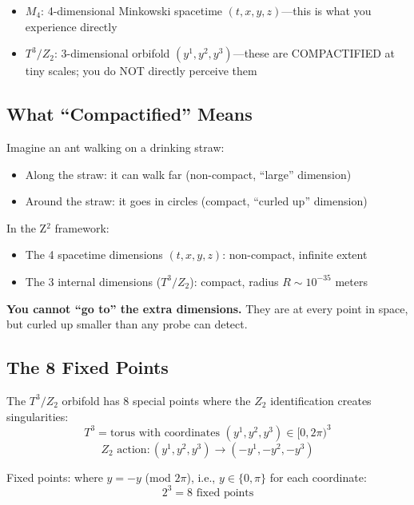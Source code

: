 \documentclass[12pt,a4paper]{article}
\begin{document}
\begin{itemize}
\item $M_4$: 4-dimensional Minkowski spacetime $(t, x, y, z)$---this is what you experience directly
\item $T^3/Z_2$: 3-dimensional orbifold $(y^1, y^2, y^3)$---these are COMPACTIFIED at tiny scales; you do NOT directly perceive them
\end{itemize}

\subsection{What ``Compactified'' Means}

Imagine an ant walking on a drinking straw:
\begin{itemize}
\item Along the straw: it can walk far (non-compact, ``large'' dimension)
\item Around the straw: it goes in circles (compact, ``curled up'' dimension)
\end{itemize}

In the Z$^2$ framework:
\begin{itemize}
\item The 4 spacetime dimensions $(t, x, y, z)$: non-compact, infinite extent
\item The 3 internal dimensions ($T^3/Z_2$): compact, radius $R \sim 10^{-35}$ meters
\end{itemize}

\textbf{You cannot ``go to'' the extra dimensions.} They are at every point in space, but curled up smaller than any probe can detect.

\subsection{The 8 Fixed Points}

The $T^3/Z_2$ orbifold has 8 special points where the $Z_2$ identification creates singularities:
\begin{equation}
T^3 = \text{torus with coordinates } (y^1, y^2, y^3) \in [0, 2\pi)^3
\end{equation}
\begin{equation}
Z_2 \text{ action}: (y^1, y^2, y^3) \rightarrow (-y^1, -y^2, -y^3)
\end{equation}

Fixed points: where $y = -y$ (mod $2\pi$), i.e., $y \in \{0, \pi\}$ for each coordinate:
\begin{equation}
2^3 = 8 \text{ fixed points}
\end{equation}
\end{document}
